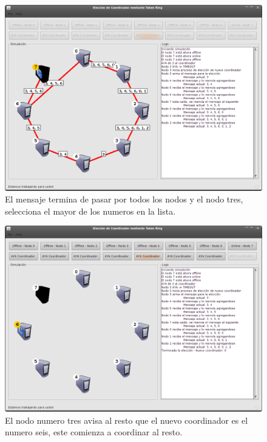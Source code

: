 \begin{figure}
\centering
 \includegraphics[scale=0.4,keepaspectratio=true]{./imagenes/tokenRing/token5.png}
 \caption{El mensaje termina de pasar por todos los nodos y el nodo tres, selecciona el mayor de los numeros en la lista.}
\end{figure}

\begin{figure}
\centering
 \includegraphics[scale=0.4,keepaspectratio=true]{./imagenes/tokenRing/token6.png}
 \caption{El nodo numero tres avisa al resto que el nuevo coordinador es el numero seis, este comienza a coordinar al resto.}
\end{figure}

